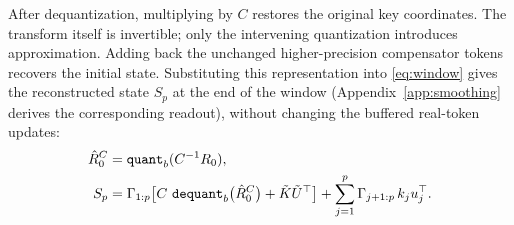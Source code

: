 After dequantization, multiplying by $C$ restores the original key coordinates.
The transform itself is invertible; only the intervening quantization introduces approximation.
Adding back the unchanged higher-precision compensator tokens recovers the initial state.
Substituting this representation into \eqref{eq:window} gives the reconstructed state $S_p$ at the end of the window (Appendix~\ref{app:smoothing} derives the corresponding readout), without changing the buffered real-token updates:
\begin{equation}
  \begin{aligned}
    \hat R_0^C &= \operatorname{\mathtt{quant}}_b(C^{-1}R_0),\\
    S_p &= \Gamma_{1:p}
      \bigl[C\,\operatorname{\mathtt{dequant}}_b\bigl(\hat R_0^C\bigr)
          +\tilde K\tilde U^{\top}\bigr]
      +\sum_{j=1}^{p}\Gamma_{j+1:p}\,k_j u_j^{\top}.
  \end{aligned}
  \label{eq:smooth}
\end{equation}
